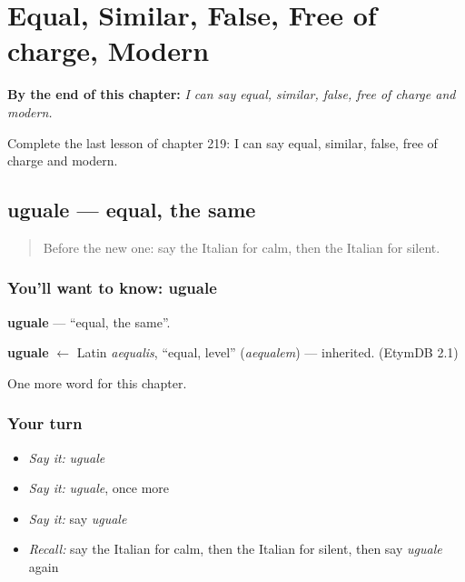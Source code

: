 
\chapter{Equal, Similar, False, Free of charge, Modern}
\label{ch:it-equal-similar-false-free-of-charge-modern}

\begin{chapteropening}
\textbf{By the end of this chapter:} \emph{I can say equal, similar, false, free of charge and modern.}

Complete the last lesson of chapter 219: I can say equal, similar, false, free of charge and modern.
\end{chapteropening}

\section[uguale]{uguale — equal, the same}

\label{lesson:IT-C219-uguale}



\begin{quote}
Before the new one: say the Italian for calm, then the Italian for silent.
\end{quote}

\subsection*{You'll want to know: uguale}
\textbf{uguale} — \textquotedblleft{}equal, the same\textquotedblright{}.

\begin{cousinweb}
\textbf{uguale} $\leftarrow$ Latin \emph{aequalis}, \textquotedblleft{}equal, level\textquotedblright{} (\emph{aequalem}) — inherited. (EtymDB 2.1)
\end{cousinweb}

\begin{grammarlens}[title={What you've built}]
One more word for this chapter.
\end{grammarlens}

\subsection*{Your turn}
\begin{itemize}
\raggedright
  \item \emph{Say it:} \emph{uguale}
  \item \emph{Say it:} \emph{uguale}, once more
  \item \emph{Say it:} say \emph{uguale}
  \item \emph{Recall:} say the Italian for calm, then the Italian for silent, then say \emph{uguale} again
\end{itemize}

